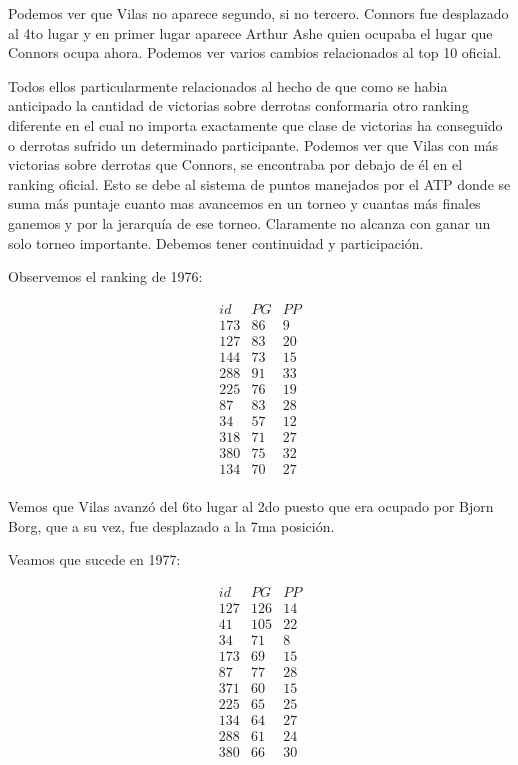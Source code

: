 Podemos ver que Vilas no aparece segundo, si no tercero. Connors fue desplazado al 4to lugar y en primer lugar aparece Arthur Ashe quien ocupaba el lugar que Connors ocupa ahora. Podemos ver varios cambios relacionados al top 10 oficial. 

Todos ellos particularmente relacionados al hecho de que como se habia anticipado la cantidad de victorias sobre derrotas conformaria otro ranking diferente en el cual no importa exactamente que clase de victorias ha conseguido o derrotas sufrido un determinado participante. Podemos ver que Vilas con más victorias sobre derrotas que Connors, se encontraba por debajo de él en el ranking oficial. Esto se debe al sistema de puntos manejados por el ATP donde se suma más puntaje cuanto mas avancemos en un torneo y cuantas más finales ganemos y por la jerarquía de ese torneo. Claramente no alcanza con ganar un solo torneo importante. Debemos tener continuidad y participación.

Observemos el ranking de 1976:

\begin{eqnarray*}
id & PG & PP \\
173 & 86 & 9 \\
127 & 83 & 20 \\
144 & 73 & 15 \\
288 & 91 & 33 \\
225 & 76 & 19 \\
87 & 83 & 28 \\
34 & 57 & 12 \\
318 & 71 & 27 \\
380 & 75 & 32 \\
134 & 70 & 27 \\
\end{eqnarray*}

Vemos que Vilas avanzó del 6to lugar al 2do puesto que era ocupado por Bjorn Borg, que a su vez, fue desplazado a la 7ma posición. 

Veamos que sucede en 1977:

\begin{eqnarray*}
id & PG & PP \\
127 & 126 & 14 \\
41 & 105 & 22 \\
34 & 71 & 8 \\
173 & 69 & 15 \\
87 & 77 & 28 \\
371 & 60 & 15 \\
225 & 65 & 25 \\
134 & 64 & 27 \\
288 & 61 & 24 \\
380 & 66 & 30 \\
\end{eqnarray*}

